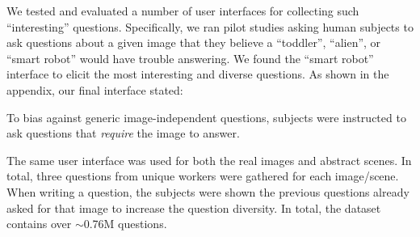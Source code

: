 We tested and evaluated a number of user interfaces for collecting
such ``interesting'' questions. %
Specifically, we ran pilot studies asking human subjects to ask questions about a given image that they believe
a ``toddler'', ``alien'', or ``smart robot'' would have trouble answering.
We found the ``smart robot'' interface to elicit the most interesting and diverse questions. 
As shown in the appendix,
our final interface stated:
\begin{center}
\end{center}
To bias against
generic image-independent questions,
subjects were instructed to ask questions that \emph{require} the image to answer. 

The same user interface was used for both the real images and abstract scenes.
In total, three questions from unique workers were gathered for each image/scene.
When writing a question, the subjects were shown the previous questions already asked for that image to
increase the question diversity. In total, the dataset contains over
$\sim$0.76M questions.



